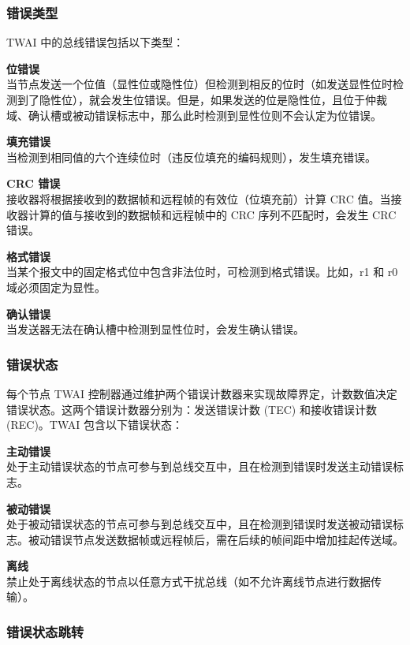 \documentclass[main\_\_CN.tex]{subfiles}
\begin{document}
\subsubsection{错误类型}

TWAI 中的总线错误包括以下类型：

{\bfseries 位错误}\\
当节点发送一个位值（显性位或隐性位）但检测到相反的位时（如发送显性位时检测到了隐性位），就会发生位错误。但是，如果发送的位是隐性位，且位于仲裁域、确认槽或被动错误标志中，那么此时检测到显性位则不会认定为位错误。

{\bfseries 填充错误}\\
当检测到相同值的六个连续位时（违反位填充的编码规则），发生填充错误。

{\bfseries CRC 错误}\\
接收器将根据接收到的数据帧和远程帧的有效位（位填充前）计算 CRC 值。当接收器计算的值与接收到的数据帧和远程帧中的 CRC 序列不匹配时，会发生 CRC 错误。


{\bfseries 格式错误}\\
当某个报文中的固定格式位中包含非法位时，可检测到格式错误。比如，r1 和 r0 域必须固定为显性。

{\bfseries 确认错误}\\
当发送器无法在确认槽中检测到显性位时，会发生确认错误。

\subsubsection{错误状态}
每个节点 TWAI 控制器通过维护两个错误计数器来实现故障界定，计数数值决定错误状态。这两个错误计数器分别为：发送错误计数 (TEC) 和接收错误计数 (REC)。TWAI 包含以下错误状态：

{\bfseries 主动错误}\label{table_item:active_err}\\
处于主动错误状态的节点可参与到总线交互中，且在检测到错误时发送主动错误标志。

{\bfseries 被动错误}\label{table_item:passive_err}\\
处于被动错误状态的节点可参与到总线交互中，且在检测到错误时发送被动错误标志。被动错误节点发送数据帧或远程帧后，需在后续的帧间距中增加挂起传送域。

{\bfseries 离线}\\
禁止处于离线状态的节点以任意方式干扰总线（如不允许离线节点进行数据传输）。

\subsubsection{错误状态跳转}
\end{document}
